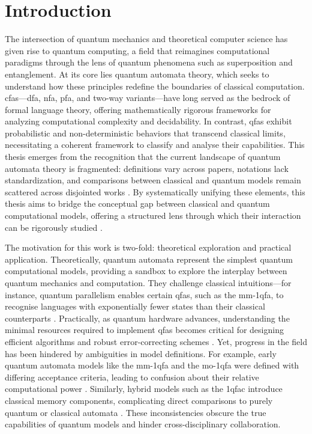 \chapter{Introduction}  
\label{chap:introduction}

The intersection of quantum mechanics and theoretical computer science has given rise to quantum computing, a field that reimagines computational paradigms through the lens of quantum phenomena such as superposition and entanglement. At its core lies quantum automata theory, which seeks to understand how these principles redefine the boundaries of classical computation. \glspl{cfa}—\gls{dfa}, \gls{nfa}, \gls{pfa}, and two-way variants—have long served as the bedrock of formal language theory, offering mathematically rigorous frameworks for analyzing computational complexity and decidability. In contrast, \glspl{qfa} exhibit probabilistic and non-deterministic behaviors that transcend classical limits, necessitating a coherent framework to classify and analyse their capabilities. This thesis emerges from the recognition that the current landscape of quantum automata theory is fragmented: definitions vary across papers, notations lack standardization, and comparisons between classical and quantum models remain scattered across disjointed works \cite{gruska2012quantum}. By systematically unifying these elements, this thesis aims to bridge the conceptual gap between classical and quantum computational models, offering a structured lens through which their interaction can be rigorously studied \cite{ambainis2009superiority}.  

The motivation for this work is two-fold: theoretical exploration and practical application. Theoretically, quantum automata represent the simplest quantum computational models, providing a sandbox to explore the interplay between quantum mechanics and computation. They challenge classical intuitions—for instance, quantum parallelism enables certain \glspl{qfa}, such as the \gls{mm-1qfa}, to recognise languages with exponentially fewer states than their classical counterparts \cite{ambainis1998one}. Practically, as quantum hardware advances, understanding the minimal resources required to implement \glspl{qfa} becomes critical for designing efficient algorithms and robust error-correcting schemes \cite{nielsen2010quantum}. Yet, progress in the field has been hindered by ambiguities in model definitions. For example, early quantum automata models like the \gls{mm-1qfa} and the \gls{mo-1qfa} were defined with differing acceptance criteria, leading to confusion about their relative computational power \cite{kondacs1997power}. Similarly, hybrid models such as the \gls{1qfac} introduce classical memory components, complicating direct comparisons to purely quantum or classical automata \cite{li2012characterizations}. These inconsistencies obscure the true capabilities of quantum models and hinder cross-disciplinary collaboration.

